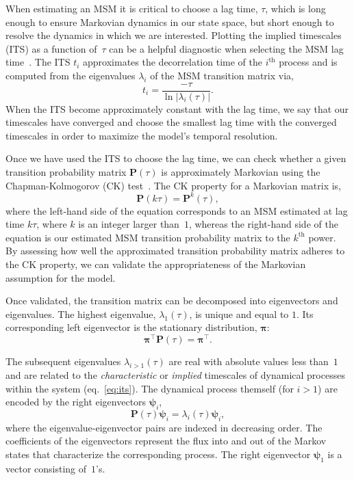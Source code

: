 \documentclass[9pt,tutorial]{livecoms}
\begin{document}
When estimating an MSM it is critical to choose a lag time, $\tau$, which is long enough to ensure Markovian dynamics in our state space, but short enough to resolve the dynamics in which we are interested.
Plotting the implied timescales (ITS) as a function of~$\tau$ can be a helpful diagnostic when selecting the MSM lag time~\cite{swope-its}.
The ITS $t_i$ approximates the decorrelation time of the $i^\textrm{th}$ process and is computed from the eigenvalues $\lambda_i$ of the MSM transition matrix via,
\begin{equation}
\label{eq:its}
t_i = \frac{-\tau}{\ln\left|\lambda_i(\tau)\right|}.
\end{equation}
When the ITS become approximately constant with the lag time, we say that our timescales have converged and choose the smallest lag time with the converged timescales in order to maximize the model's temporal resolution.

Once we have used the ITS to choose the lag time, we can check whether a given transition probability matrix $\mathbf{P}(\tau)$ is approximately Markovian using the Chapman-Kolmogorov (CK) test~\cite{noe-folding-pathways}.
The CK property for a Markovian matrix is,
\begin{equation}
\mathbf{P}(k \tau) = \mathbf{P}^k(\tau),
\end{equation}
where the left-hand side of the equation corresponds to an MSM estimated at lag time $k\tau$, where $k$ is an integer larger than~$1$, whereas the right-hand side of the equation is our estimated MSM transition probability matrix to the $k^\textrm{th}$ power.
By assessing how well the approximated transition probability matrix adheres to the CK property, we can validate the appropriateness of the Markovian assumption for the model.

Once validated, the transition matrix can be decomposed into eigenvectors and eigenvalues.
The highest eigenvalue, $\lambda_1(\tau)$, is unique and equal to $1$.
Its corresponding left eigenvector is the stationary distribution, $\bm{\pi}$:
\begin{equation}
\bm{\pi}^\top  \mathbf{P}(\tau) = \bm{\pi}^\top.
\end{equation}

The subsequent eigenvalues $\lambda_{i>1}(\tau)$ are real with absolute values less than~$1$ and are related to the \emph{characteristic} or \emph{implied} timescales of dynamical processes within the system (eq.~\ref{eq:its}).
The dynamical process themself (for $i>1$) are encoded by the right eigenvectors $\bm{\psi}_i$,
\begin{equation}
\mathbf{P}(\tau)\bm{\psi}_i = \lambda_i(\tau) \bm{\psi}_i,
\end{equation}
where the eigenvalue-eigenvector pairs are indexed in decreasing order.
The coefficients of the eigenvectors represent the flux into and out of the Markov states that characterize the corresponding process.
The right eigenvector $\bm{\psi}_1$ is a vector consisting of~$1$'s.
\end{document}
